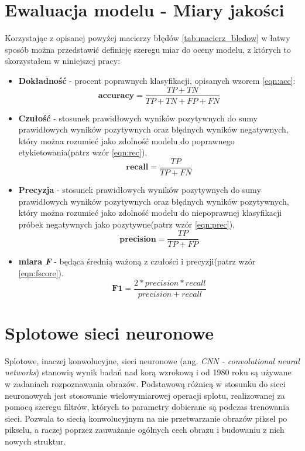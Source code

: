 \section{Ewaluacja modelu - Miary jakości}

Korzystając z opisanej powyżej macierzy błędów \ref{tab:macierz_bledow} w łatwy sposób można przedstawić definicję szeregu miar do oceny modelu, z których to skorzystałem w niniejszej pracy:
\begin{itemize}
	\item \textbf{Dokładność} - procent poprawnych klasyfikacji, opisanych wzorem \ref{eqn:acc}:
	\begin{equation}
	\mathbf{accuracy} = \frac{TP + TN}{TP + TN + FP + FN}
	\label{eqn:acc}
	\end{equation}
	\item \textbf{Czułość} - stosunek prawidłowych wyników pozytywnych do sumy prawidłowych wyników pozytywnych oraz błędnych wyników negatywnych, który można rozumieć jako zdolność modelu do poprawnego etykietowania(patrz wzór \ref{eqn:rec}),
	\begin{equation}
	\mathbf{recall} = \frac{TP}{TP + FN}
	\label{eqn:rec}
	\end{equation}
	\item \textbf{Precyzja} - stosunek prawidłowych wyników pozytywnych do sumy prawidłowych wyników pozytywnych oraz błędnych wyników pozytywnych, który można rozumieć jako zdolność modelu do niepoprawnej klasyfikacji próbek negatywnych jako pozytywne(patrz wzór \ref{eqn:prec}),
	\begin{equation}
	\mathbf{precision} = \frac{TP}{TP + FP}
	\label{eqn:prec}
	\end{equation}
	\item \textbf{miara \textit{F}} - będąca średnią ważoną z czułości i precyzji(patrz wzór \ref{eqn:fscore}).
	\begin{equation}
	\mathbf{F1}= \frac{2 * precision * recall}{precision + recall}
	\label{eqn:fscore}
	\end{equation}
\end{itemize}

\section{Splotowe sieci neuronowe}

Splotowe, inaczej konwolucyjne, sieci neuronowe (ang. \textit{CNN - convolutional neural networks}) stanowią wynik badań nad korą wzrokową i od 1980 roku są używane w zadaniach rozpoznawania obrazów\cite{hands_on}. Podstawową różnicą w stosunku do sieci neuronowych jest stosowanie wielowymiarowej operacji splotu, realizowanej za pomocą szeregu filtrów, których to parametry dobierane są podczas trenowania sieci. Pozwala to siecią konwolucyjnym na nie przetwarzanie obrazów piksel po pikselu, a raczej poprzez zauważanie ogólnych cech obrazu i budowaniu z nich nowych struktur. \\

